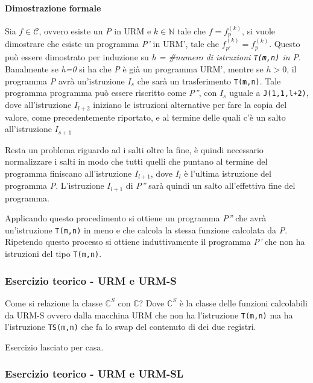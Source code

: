 \paragraph{Dimostrazione formale} Sia $f \in \mathcal{C}$, ovvero esiste un \emph{P} in URM e $k \in \mathbb{N}$ tale che $f = f_{p}^{(k)}$, si vuole dimostrare che esiste un programma \emph{P'} in URM', tale che $f_{p'}^{(k)} = f_{p}^{(k)}$.
Questo può essere dimostrato per induzione su \emph{h = \#numero di
istruzioni \texttt{T(m,n)} in P}.
Banalmente se \emph{h=0} si ha che \emph{P} è già un programma URM', mentre se $h > 0$, il programma \emph{P} avrà un'istruzione $I_s$ che sarà un trasferimento \texttt{T(m,n)}. 
Tale programma programma può essere riscritto come \emph{P''}, con $I_s$ uguale a \texttt{J(1,1,l+2)}, dove all'istruzione $I_{l+2}$ iniziano le istruzioni alternative per fare la copia del valore, come precedentemente riportato, e al termine delle quali c'è un salto all'istruzione $I_{s+1}$

Resta un problema riguardo ad i salti oltre la fine, è quindi necessario normalizzare i salti in modo che tutti quelli che puntano al termine del programma finiscano all'istruzione $I_{l+1}$, dove $I_l$ è l'ultima istruzione del programma \emph{P}. L'istruzione $I_{l+1}$ di \emph{P''} sarà quindi un salto all'effettiva fine del programma.

Applicando questo procedimento si ottiene un programma \emph{P''} che avrà un'istruzione \texttt{T(m,n)} in meno e che calcola la stessa funzione calcolata da \emph{P}.
Ripetendo questo processo si ottiene induttivamente il programma \emph{P'} che non ha istruzioni del tipo \texttt{T(m,n)}.

\subsubsection{Esercizio teorico - URM e URM-S}\label{esercizio-teorico---urm-e-urm-s}

Come si relazione la classe $\mathbb{C}^S$ con $\mathbb{C}$? Dove $\mathbb{C}^S$ è la classe delle funzioni calcolabili da URM-S ovvero dalla macchina URM che non ha l'istruzione \texttt{T(m,n)} ma ha l'istruzione \texttt{TS(m,n)} che fa lo swap del contenuto di dei due registri.

Esercizio lasciato per casa.

\subsubsection{Esercizio teorico - URM e URM-SL}\label{esercizione-teorico---urm-e-urm-sl}

